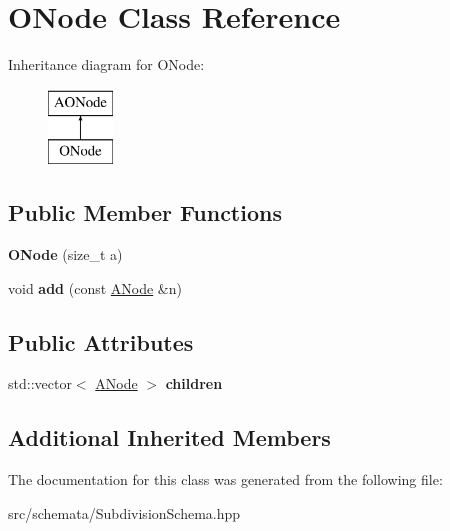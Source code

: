 \hypertarget{classONode}{}\section{O\+Node Class Reference}
\label{classONode}
Inheritance diagram for O\+Node\+:\begin{figure}[H]
\begin{center}
\leavevmode
\includegraphics[height=2.000000cm]{classONode}
\end{center}
\end{figure}
\subsection*{Public Member Functions}
\begin{DoxyCompactItemize}
\item 
\mbox{\label{classONode_a3226a302281a35b89a6c0ba8b480fe78}} 
{\bfseries O\+Node} (size\+\_\+t a)
\item 
\mbox{\label{classONode_a8e4d2ce12d0fb10d38ce2a6142f11269}} 
void {\bfseries add} (const \mbox{\hyperlink{classANode}{A\+Node}} \&n)
\end{DoxyCompactItemize}
\subsection*{Public Attributes}
\begin{DoxyCompactItemize}
\item 
\mbox{\label{classONode_a3de9840b800820f217fc9110211d34c5}} 
std\+::vector$<$ \mbox{\hyperlink{classANode}{A\+Node}} $>$ {\bfseries children}
\end{DoxyCompactItemize}
\subsection*{Additional Inherited Members}


The documentation for this class was generated from the following file\+:\begin{DoxyCompactItemize}
\item 
src/schemata/Subdivision\+Schema.\+hpp\end{DoxyCompactItemize}
